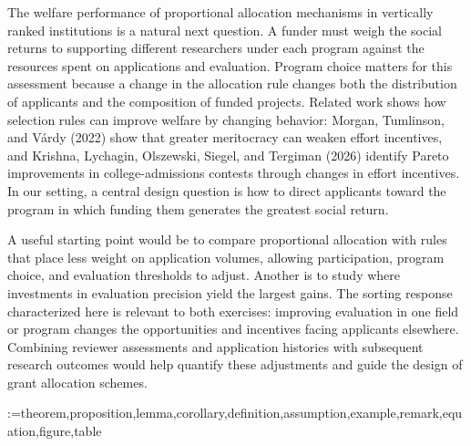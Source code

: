 \documentclass[12pt,reqno]{amsart}
\theoremstyle{definition}
\theoremstyle{plain} %
\begin{document}
The welfare performance of proportional allocation mechanisms in vertically ranked institutions is a natural next question. A funder must weigh the social returns to supporting different researchers under each program against the resources spent on applications and evaluation. Program choice matters for this assessment because a change in the allocation rule changes both the distribution of applicants and the composition of funded projects. Related work shows how selection rules can improve welfare by changing behavior: Morgan, Tumlinson, and Várdy (2022) show that greater meritocracy can weaken effort incentives, and Krishna, Lychagin, Olszewski, Siegel, and Tergiman (2026) identify Pareto improvements in college-admissions contests through changes in effort incentives. In our setting, a central design question is how to direct applicants toward the program in which funding them generates the greatest social return. 

A useful starting point would be to compare proportional allocation with rules that place less weight on application volumes, allowing participation, program choice, and evaluation thresholds to adjust. Another is to study where investments in evaluation precision yield the largest gains. The sorting response characterized here is relevant to both exercises: improving evaluation in one field or program changes the opportunities and incentives facing applicants elsewhere. Combining reviewer assessments and application histories with subsequent research outcomes would help quantify these adjustments and guide the design of grant allocation schemes.


\newpage
\setcounter{section}{0}
\renewcommand{\thesection}{A.\arabic{section}}
\renewcommand{\theHsection}{A.\arabic{section}}
\makeatletter
\@for\@tempa:=theorem,proposition,lemma,corollary,definition,assumption,example,remark,equation,figure,table\do{%
  \setcounter{\@tempa}{0}%
  \expandafter\edef\csname the\@tempa\endcsname{A\noexpand\arabic{\@tempa}}%
  \expandafter\edef\csname theH\@tempa\endcsname{A\noexpand\arabic{\@tempa}}}
\makeatother




\end{document}
